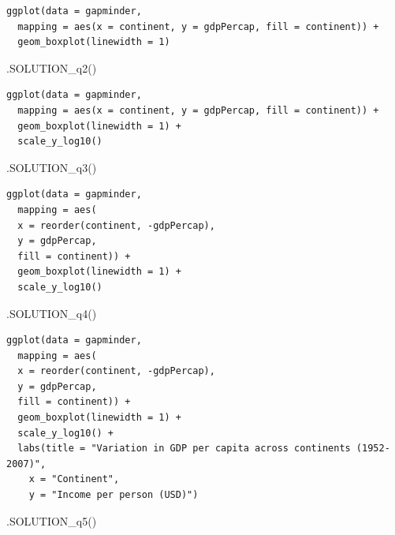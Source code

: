 \documentclass[
  letterpaper,
  DIV=11,
  numbers=noendperiod]{scrreprt}
\newenvironment{Shaded}{\begin{snugshade}}{\end{snugshade}}
\newcommand{\FunctionTok}[1]{\textcolor[rgb]{0.28,0.35,0.67}{#1}}
\newcommand{\NormalTok}[1]{\textcolor[rgb]{0.00,0.23,0.31}{#1}}
\begin{document}
\begin{verbatim}
ggplot(data = gapminder,
  mapping = aes(x = continent, y = gdpPercap, fill = continent)) +
  geom_boxplot(linewidth = 1)
\end{verbatim}

\begin{Shaded}
\begin{Highlighting}[]
\FunctionTok{.SOLUTION\_q2}\NormalTok{()}
\end{Highlighting}
\end{Shaded}

\begin{verbatim}
ggplot(data = gapminder,
  mapping = aes(x = continent, y = gdpPercap, fill = continent)) +
  geom_boxplot(linewidth = 1) +
  scale_y_log10()
\end{verbatim}

\begin{Shaded}
\begin{Highlighting}[]
\FunctionTok{.SOLUTION\_q3}\NormalTok{() }
\end{Highlighting}
\end{Shaded}

\begin{verbatim}
ggplot(data = gapminder,
  mapping = aes(
  x = reorder(continent, -gdpPercap), 
  y = gdpPercap, 
  fill = continent)) +
  geom_boxplot(linewidth = 1) +
  scale_y_log10()
\end{verbatim}

\begin{Shaded}
\begin{Highlighting}[]
\FunctionTok{.SOLUTION\_q4}\NormalTok{()}
\end{Highlighting}
\end{Shaded}

\begin{verbatim}
ggplot(data = gapminder,
  mapping = aes(
  x = reorder(continent, -gdpPercap), 
  y = gdpPercap, 
  fill = continent)) +
  geom_boxplot(linewidth = 1) +
  scale_y_log10() +
  labs(title = "Variation in GDP per capita across continents (1952-2007)",
    x = "Continent",
    y = "Income per person (USD)")
\end{verbatim}

\begin{Shaded}
\begin{Highlighting}[]
\FunctionTok{.SOLUTION\_q5}\NormalTok{()}
\end{Highlighting}
\end{Shaded}
\end{document}
